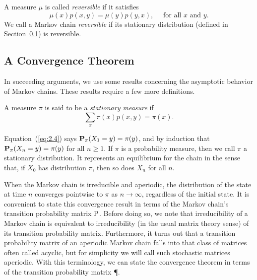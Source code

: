 \begin{definition}
\label{def:2.1.3}
A measure $\mu$ is called \emph{reversible} if it satisfies
\[
\mu(x)p(x,y) = \mu(y)p(y,x), \quad  \text{ for all $x$ and $y$.}
\]
We call a Markov chain \emph{reversible} if its stationary distribution (defined
in Section~\ref{sec:convergence-theorem}) is reversible. 
\end{definition}




\subsection{A Convergence Theorem}
\label{sec:convergence-theorem}
In succeeding arguments, we use some results concerning the asymptotic behavior of
Markov chains. These results require a few more definitions.

\begin{definition}
A measure $\pi$ is said to be a \emph{stationary measure} if
\begin{equation}
  \label{eq:2.4}
\sum_x \pi(x) p(x,y) = \pi(x).
\end{equation}
\end{definition}

Equation~(\ref{eq:2.4}) says $\bP_\pi(X_1 = y) = \pi(y)$, 
and by induction that $\bP_\pi(X_n = y) = \pi(y)$ for all $n \geq 1$. 
If $\pi$ is a probability measure, then we call $\pi$ a stationary distribution. It
represents an equilibrium for the chain in the sense that, if $X_0$ has
distribution $\pi$, then so does $X_n$ for all $n$.

When the Markov chain is irreducible and aperiodic, the distribution of the state at time
$n$ converges pointwise to $\pi$ as $n \rightarrow \infty$, regardless of the
initial state. It is convenient to state this convergence result in terms of the
Markov chain's transition probability matrix $\P$. Before doing so, we note that
irreducibility of a Markov chain is equivalent to irreducibility (in the usual 
matrix theory sense) of its transition probability matrix. Furthermore, it turns
out that a transition probability matrix of an aperiodic Markov chain falls into
that class of matrices often called acyclic, but for simplicity we will call
such stochastic matrices aperiodic. With this terminology, we can state the
convergence theorem in terms of the transition probability matrix \P. 

